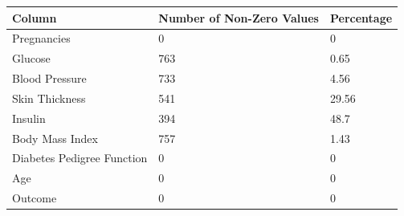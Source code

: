\documentclass[12pt]{article}
\begin{document}
{
\clearpage
\begin{landscape}
\centering
\begin{table}[]
\centering
\vspace{5cm}
\begin{tabular}{|l|l|l|}
\hline
Column                     & Number of Non-Zero Values & Percentage \\ \hline
Pregnancies                & 0                         & 0          \\ \hline
Glucose                    & 763                       & 0.65       \\ \hline
Blood Pressure             & 733                       & 4.56       \\ \hline
Skin Thickness             & 541                       & 29.56      \\ \hline
Insulin                    & 394                       & 48.7       \\ \hline
Body Mass Index            & 757                       & 1.43       \\ \hline
Diabetes Pedigree Function & 0                         & 0          \\ \hline
Age                        & 0                         & 0          \\ \hline
Outcome                    & 0                         & 0          \\ \hline
\end{tabular}
\end{table}
\label{table:4}
\end{landscape}
\clearpage
}
\end{document}
